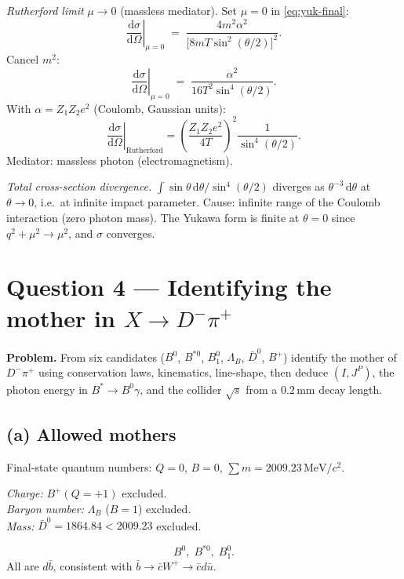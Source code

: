 \documentclass[11pt]{article}
\newcommand{\de}{\mathrm{d}}
\begin{document}
\emph{Rutherford limit} $\mu\to 0$ (massless mediator). Set $\mu=0$ in \eqref{eq:yuk-final}:
\[
\left.\frac{\de\sigma}{\de\Omega}\right|_{\mu=0}\;=\;\frac{4m^{2}\alpha^{2}}{\bigl[8mT\sin^{2}(\theta/2)\bigr]^{2}}.
\]
Cancel $m^{2}$:
\[
\left.\frac{\de\sigma}{\de\Omega}\right|_{\mu=0}\;=\;\frac{\alpha^{2}}{16T^{2}\sin^{4}(\theta/2)}.
\]
With $\alpha=Z_1Z_2 e^{2}$ (Coulomb, Gaussian units):
\begin{equation}
\boxed{\;\left.\frac{\de\sigma}{\de\Omega}\right|_\text{Rutherford}=\left(\frac{Z_1Z_2 e^{2}}{4T}\right)^{2}\frac{1}{\sin^{4}(\theta/2)}.\;}
\end{equation}
Mediator: massless photon (electromagnetism).

\emph{Total cross-section divergence.} $\int\sin\theta\,\de\theta/\sin^{4}(\theta/2)$ diverges as $\theta^{-3}\,\de\theta$ at $\theta\to 0$, i.e.\ at infinite impact parameter. Cause: infinite range of the Coulomb interaction (zero photon mass). The Yukawa form is finite at $\theta=0$ since $q^{2}+\mu^{2}\to\mu^{2}$, and $\sigma$ converges.

\section*{Question 4 --- Identifying the mother in $X\to D^{-}\pi^{+}$}

\textbf{Problem.} From six candidates ($B^{0}$, $B^{*0}$, $B^{0}_{1}$, $\Lambda_B$, $\bar D^{0}$, $B^{+}$) identify the mother of $D^{-}\pi^{+}$ using conservation laws, kinematics, line-shape, then deduce $(I,J^P)$, the photon energy in $B^{*}\to B^{0}\gamma$, and the collider $\sqrt{s}$ from a $0.2\,\text{mm}$ decay length.

\subsection*{(a) Allowed mothers}

Final-state quantum numbers: $Q=0$, $B=0$, $\sum m=2009.23\,\text{MeV}/c^{2}$.

\emph{Charge:} $B^{+}(Q=+1)$ excluded.\\
\emph{Baryon number:} $\Lambda_B$ ($B=1$) excluded.\\
\emph{Mass:} $\bar D^{0}=1864.84<2009.23$ excluded.

\begin{equation}
\boxed{\,B^{0},\;B^{*0},\;B^{0}_{1}.\,}
\end{equation}
All are $d\bar b$, consistent with $\bar b\to\bar c W^{+}\to\bar c d\bar u$.
\end{document}

